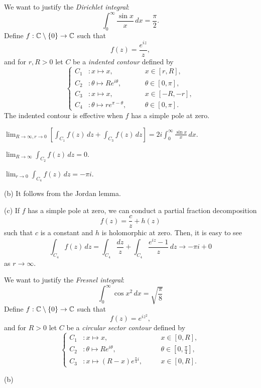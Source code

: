 \documentclass{../note}
\begin{document}
\begin{prb}
We want to justify the \emph{Dirichlet integral}:
\[\int_0^\infty\frac{\sin x}x\,dx=\frac\pi2.\]
Define $f:\mathbb{C}\setminus\{0\}\to\mathbb{C}$ such that
\[f(z)=\frac{e^{iz}}z,\]
and for $r,R>0$ let $C$ be a \emph{indented contour} defined by
\[\left\{
\begin{alignedat}{2}
C_1&:x\mapsto x,&\quad&x\in[r,R],\\
C_2&:\theta\mapsto Re^{i\theta},&&\theta\in[0,\pi],\\
C_3&:x\mapsto x,&&x\in[-R,-r],\\
C_4&:\theta\mapsto re^{\pi-\theta},&&\theta\in[0,\pi].
\end{alignedat}
\right.\]
The indented contour is effective when $f$ has a simple pole at zero.
\begin{parts}
\item $\lim_{R\to\infty,r\to0}[\int_{C_1}f(z)\,dz+\int_{C_3}f(z)\,dz]=2i\int_0^\infty\frac{\sin x}x\,dx$.
\item $\lim_{R\to\infty}\int_{C_2}f(z)\,dz=0$.
\item $\lim_{r\to0}\int_{C_4}f(z)\,dz=-\pi i$.
\end{parts}
\end{prb}
\begin{pf}
(b)
It follows from the Jordan lemma.

(c)
If $f$ has a simple pole at zero, we can conduct a partial fraction decomposition
\[f(z)=\frac cz+h(z)\]
such that $c$ is a constant and $h$ is holomorphic at zero.
Then, it is easy to see
\[\int_{C_4}f(z)\,dz=\int_{C_4}\frac{dz}z+\int_{C_4}\frac{e^{iz}-1}z\,dz\to-\pi i+0\]
as $r\to\infty$.
\end{pf}

\begin{prb}
We want to justify the \emph{Fresnel integral}:
\[\int_0^\infty\cos x^2\,dx=\sqrt{\frac\pi8}\]
Define $f:\mathbb{C}\setminus\{0\}\to\mathbb{C}$ such that
\[f(z)=e^{iz^2},\]
and for $R>0$ let $C$ be a \emph{circular sector contour} defined by
\[\left\{
\begin{alignedat}{2}
C_1&:x\mapsto x,&\quad&x\in[0,R],\\
C_2&:\theta\mapsto Re^{i\theta},&&\theta\in[0,\tfrac\pi4],\\
C_3&:x\mapsto(R-x)e^{\frac\pi4i},&&x\in[0,R].
\end{alignedat}
\right.\]
\begin{parts}
\item
\end{parts}
\end{prb}
\begin{pf}
(b)

\end{pf}
\end{document}
